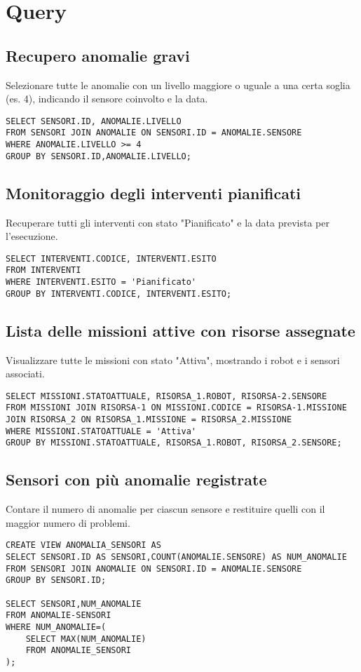 \section{Query}
\subsection{Recupero anomalie gravi}
Selezionare tutte le anomalie con un livello maggiore o uguale a una certa soglia (es. 4), indicando il sensore coinvolto e la data.
\begin{verbatim}
SELECT SENSORI.ID, ANOMALIE.LIVELLO
FROM SENSORI JOIN ANOMALIE ON SENSORI.ID = ANOMALIE.SENSORE
WHERE ANOMALIE.LIVELLO >= 4
GROUP BY SENSORI.ID,ANOMALIE.LIVELLO;
\end{verbatim}
\subsection{Monitoraggio degli interventi pianificati}
Recuperare tutti gli interventi con stato "Pianificato" e la data prevista per l'esecuzione.
\begin{verbatim}
SELECT INTERVENTI.CODICE, INTERVENTI.ESITO
FROM INTERVENTI
WHERE INTERVENTI.ESITO = 'Pianificato'
GROUP BY INTERVENTI.CODICE, INTERVENTI.ESITO;
\end{verbatim}
\subsection{Lista delle missioni attive con risorse assegnate}
Visualizzare tutte le missioni con stato "Attiva", mostrando i robot e i sensori associati.
\begin{verbatim}
SELECT MISSIONI.STATOATTUALE, RISORSA_1.ROBOT, RISORSA-2.SENSORE
FROM MISSIONI JOIN RISORSA-1 ON MISSIONI.CODICE = RISORSA-1.MISSIONE JOIN RISORSA_2 ON RISORSA_1.MISSIONE = RISORSA_2.MISSIONE  
WHERE MISSIONI.STATOATTUALE = 'Attiva'
GROUP BY MISSIONI.STATOATTUALE, RISORSA_1.ROBOT, RISORSA_2.SENSORE;
\end{verbatim}
\subsection{Sensori con più anomalie registrate}
Contare il numero di anomalie per ciascun sensore e restituire quelli con il maggior numero di problemi.
\begin{verbatim}
CREATE VIEW ANOMALIA_SENSORI AS
SELECT SENSORI.ID AS SENSORI,COUNT(ANOMALIE.SENSORE) AS NUM_ANOMALIE
FROM SENSORI JOIN ANOMALIE ON SENSORI.ID = ANOMALIE.SENSORE
GROUP BY SENSORI.ID;

SELECT SENSORI,NUM_ANOMALIE
FROM ANOMALIE-SENSORI
WHERE NUM_ANOMALIE=(
    SELECT MAX(NUM_ANOMALIE)
    FROM ANOMALIE_SENSORI
);
\end{verbatim}
